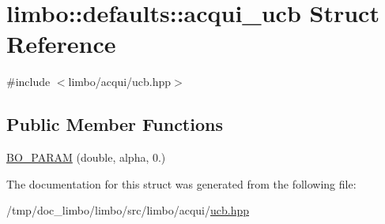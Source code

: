 \hypertarget{structlimbo_1_1defaults_1_1acqui__ucb}{}\section{limbo\+:\+:defaults\+:\+:acqui\+\_\+ucb Struct Reference}
\label{structlimbo_1_1defaults_1_1acqui__ucb}


{\ttfamily \#include $<$limbo/acqui/ucb.\+hpp$>$}

\subsection*{Public Member Functions}
\begin{DoxyCompactItemize}
\item 
\hyperlink{group__acqui__defaults_ga1f72be83648befc624f5468668e5728a}{B\+O\+\_\+\+P\+A\+R\+A\+M} (double, alpha, 0.)
\end{DoxyCompactItemize}


The documentation for this struct was generated from the following file\+:\begin{DoxyCompactItemize}
\item 
/tmp/doc\+\_\+limbo/limbo/src/limbo/acqui/\hyperlink{ucb_8hpp}{ucb.\+hpp}\end{DoxyCompactItemize}
